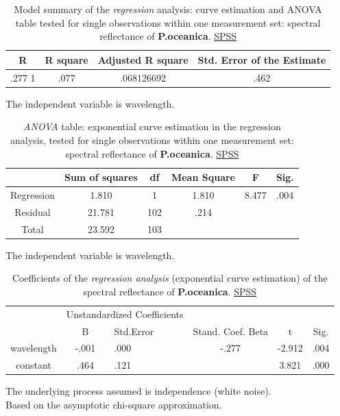 \documentclass[10pt, a4paper]{article}
\begin{document}
\begin{appendices}
\begin{table}[htbp]
	\caption{Model summary of the \textit{regression} analysis: curve estimation and ANOVA table tested for single observations within one measurement set: spectral 			reflectance of \textbf{P.oceanica}. \href{http://www.spss.com/}{SPSS}}
	\begin{center}
		\begin{tabular}{|c|c|c|c|}
			\hline\hline
			\textbf{R} & \textbf{R square} & \textbf{Adjusted R square} & \textbf{Std. Error of the Estimate} \\ \hline\hline
			.277 1 & .077 & .068126692 & .462 \\ \hline
		\end{tabular}
	\end{center}
	The independent variable is wavelength. 
	\label{tab:5}
\end{table}

\begin{table}[htbp]
	\caption{\textit{ANOVA} table: exponential curve estimation in the regression analysis, tested for single observations within one measurement set: spectral reflectance of 		\textbf{P.oceanica}. \href{http://www.spss.com/}{SPSS}}
	\begin{center}
		\begin{tabular}{|c|c|c|c| c|c|}
			\hline\hline
			& \textbf{Sum of squares} & \textbf{df} & \textbf{Mean Square} & F & Sig.\\ \hline\hline
			Regression & 1.810 & 1 & 1.810 & 8.477 & .004\\ \hline
			Residual & 21.781 & 102 & .214 & & \\ \hline
			Total & 23.592 & 103 & & & \\ \hline
		\end{tabular}
	\end{center}
	The independent variable is wavelength. 
	\label{tab:6}
\end{table}

\begin{table}[htbp]
	\caption{Coefficients of the \textit{regression analysis} (exponential curve estimation) of the spectral reflectance of \textbf{P.oceanica}. \href{http://www.spss.com/}{SPSS}}
	\begin{center}
		\begin{tabular}{| c | c | p{2cm}| c | c | c |}
			\hline\hline
			& \multicolumn{2}{|c|}{Unstandardized Coefficients}\\
			\cline{2-3}
			& B & Std.Error & Stand. Coef. Beta & t & Sig.\\ \hline\hline
			wavelength & -.001 & .000 & -.277 & -2.912 & .004 \\ \hline
			constant & .464 & .121 & & 3.821 & .000 \\ \hline
		\end{tabular}
	\end{center}
	The underlying process assumed is independence (white noise).\\
	 Based on the asymptotic chi-square approximation.
	\label{tab:7}
\end{table}
\pagebreak


\end{appendices}
\end{document}
